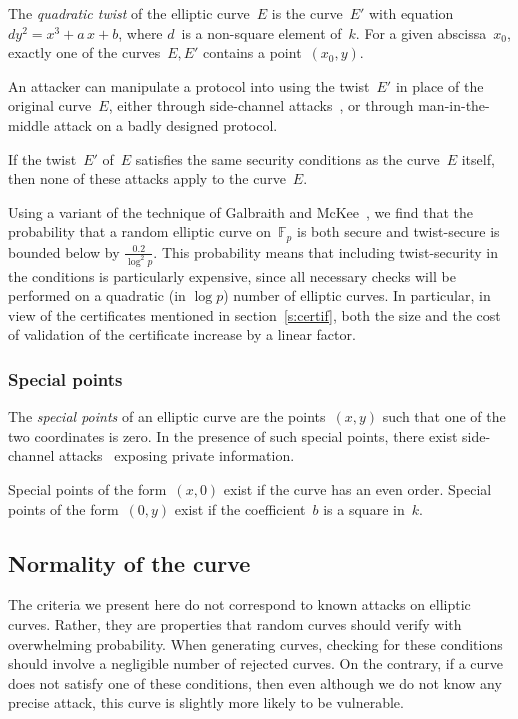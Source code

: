 \documentclass{article}
\def\F{\mathbb{F}}
\begin{document}
The \emph{quadratic twist} of the elliptic curve~$E$
is the curve~$E'$ with equation~$d y^2 = x^3 + a\,x + b$,
where $d$~is a non-square element of~$k$.
For a given abscissa~$x_0$,
exactly one of the curves~$E, E'$ contains a point~$(x_0, y)$.

An attacker can manipulate a protocol into using the twist~$E'$
in place of the original curve~$E$,
either through side-channel attacks~\cite{fdtc2008flrv},
or through man-in-the-middle attack on a badly designed protocol.

If the twist~$E'$ of~$E$ satisfies
the same security conditions as the curve~$E$ itself, then
none of these attacks apply to the curve~$E$.

Using a variant of the technique of Galbraith and McKee~\cite{lms2000gm},
we find that the probability that a random elliptic curve on~$\F_p$
is both secure and twist-secure
is bounded below by $\frac{0.2}{\log^2 p}$.
This probability means that
including twist-security in the conditions is particularly expensive,
since all necessary checks will be performed on
a quadratic (in $\log p$) number of elliptic curves.
In particular, in view of
the certificates mentioned in section~\ref{s:certif},
both the size and the cost of validation of the certificate
increase by a linear factor.

\subsubsection{Special points}
\label{sss:special-points}

The \emph{special points} of an elliptic curve
are the points~$(x,y)$ such that one of the two coordinates is zero.
In the presence of such special points,
there exist side-channel attacks~\cite{pkc2003goubin}
exposing private information.

Special points of the form~$(x, 0)$ exist if the curve has
an even order.
Special points of the form~$(0, y)$ exist if the coefficient~$b$
is a square in~$k$.

\subsection{Normality of the curve}
\label{ss:normal}

The criteria we present here do not correspond to
known attacks on elliptic curves.
Rather, they are properties that random curves should verify
with overwhelming probability.
When generating curves, checking for these conditions
should involve a negligible number of rejected curves.
On the contrary, if a curve does not satisfy one of these conditions,
then even although we do not know any precise attack,
this curve is slightly more likely to be vulnerable.
\end{document}
